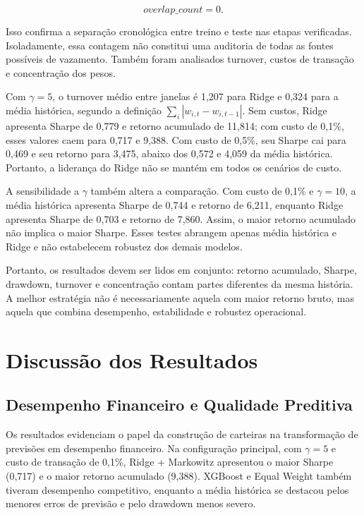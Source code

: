 \documentclass[12pt,a4paper]{article}
\begin{document}
\begin{equation}
overlap\_count = 0.
\end{equation}

Isso confirma a separação cronológica entre treino e teste nas etapas verificadas. Isoladamente, essa contagem não constitui uma auditoria de todas as fontes possíveis de vazamento. Também foram analisados turnover, custos de transação e concentração dos pesos.

Com $\gamma=5$, o turnover médio entre janelas é 1,207 para Ridge e 0,324 para a média histórica, segundo a definição $\sum_i|w_{i,t}-w_{i,t-1}|$. Sem custos, Ridge apresenta Sharpe de 0,779 e retorno acumulado de 11,814; com custo de 0,1\%, esses valores caem para 0,717 e 9,388. Com custo de 0,5\%, seu Sharpe cai para 0,469 e seu retorno para 3,475, abaixo dos 0,572 e 4,059 da média histórica. Portanto, a liderança do Ridge não se mantém em todos os cenários de custo.

A sensibilidade a $\gamma$ também altera a comparação. Com custo de 0,1\% e $\gamma=10$, a média histórica apresenta Sharpe de 0,744 e retorno de 6,211, enquanto Ridge apresenta Sharpe de 0,703 e retorno de 7,860. Assim, o maior retorno acumulado não implica o maior Sharpe. Esses testes abrangem apenas média histórica e Ridge e não estabelecem robustez dos demais modelos.

Portanto, os resultados devem ser lidos em conjunto: retorno acumulado, Sharpe, drawdown, turnover e concentração contam partes diferentes da mesma história. A melhor estratégia não é necessariamente aquela com maior retorno bruto, mas aquela que combina desempenho, estabilidade e robustez operacional.

\section{Discussão dos Resultados}

\subsection{Desempenho Financeiro e Qualidade Preditiva}

Os resultados evidenciam o papel da construção de carteiras na transformação de previsões em desempenho financeiro. Na configuração principal, com $\gamma=5$ e custo de transação de 0,1\%, Ridge + Markowitz apresentou o maior Sharpe (0,717) e o maior retorno acumulado (9,388). XGBoost e Equal Weight também tiveram desempenho competitivo, enquanto a média histórica se destacou pelos menores erros de previsão e pelo drawdown menos severo.
\end{document}
